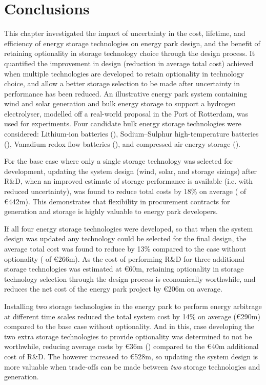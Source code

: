 \section{Conclusions} \label{sec:parks-conclusions}

This chapter investigated the impact of uncertainty in the cost, lifetime, and efficiency of energy storage technologies on energy park design, and the benefit of retaining optionality in storage technology choice through the design process. It quantified the improvement in design (reduction in average total cost) achieved when multiple technologies are developed to retain optionality in technology choice, and allow a better storage selection to be made after uncertainty in performance has been reduced.
An illustrative energy park system containing wind and solar generation and bulk energy storage to support a hydrogen electrolyser, modelled off a real-world proposal in the Port of Rotterdam, was used for experiments. Four candidate bulk energy storage technologies were considered: Lithium-ion batteries (), Sodium--Sulphur high-temperature batteries (), Vanadium redox flow batteries (), and compressed air energy storage ().

For the base case where only a single storage technology was selected for development, updating the system design (wind, solar, and storage sizings) after R\&D, when an improved estimate of storage performance is available (i.e. with reduced uncertainty), was found to reduce total costs by 18\% on average ( of \euro442m). This demonstrates that flexibility in procurement contracts for generation and storage is highly valuable to energy park developers.

If all four energy storage technologies were developed, so that when the system design was updated any technology could be selected for the final design, the average total cost was found to reduce by 13\% compared to the case without optionality ( of \euro266m). As the cost of performing R\&D for three additional storage technologies was estimated at \euro60m, retaining optionality in storage technology selection through the design process is economically worthwhile, and reduces the net cost of the energy park project by \euro206m on average.

Installing two storage technologies in the energy park to perform energy arbitrage at different time scales reduced the total system cost by 14\% on average (\euro290m) compared to the base case without optionality. And in this, case developing the two extra storage technologies to provide optionality was determined to not be worthwhile, reducing average costs by \euro36m () compared to the \euro40m additional cost of R\&D. The  however increased to \euro528m, so updating the system design is more valuable when trade-offs can be made between \textit{two} storage technologies and generation.

